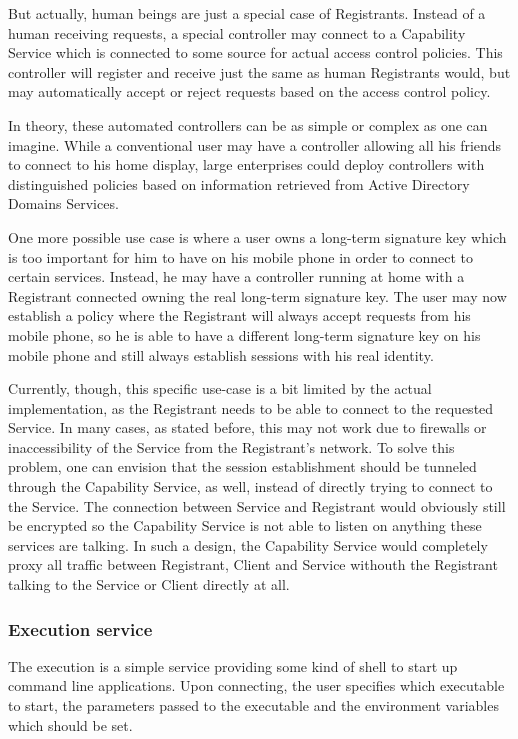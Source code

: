 But actually, human beings are just a special case of Registrants.
Instead of a human receiving requests, a special controller may connect to a Capability Service which is connected to some source for actual access control policies.
This controller will register and receive just the same as human Registrants would, but may automatically accept or reject requests based on the access control policy.

In theory, these automated controllers can be as simple or complex as one can imagine.
While a conventional user may have a controller allowing all his friends to connect to his home display, large enterprises could deploy controllers with distinguished policies based on information retrieved from Active Directory Domains Services.

One more possible use case is where a user owns a long-term signature key which is too important for him to have on his mobile phone in order to connect to certain services.
Instead, he may have a controller running at home with a Registrant connected owning the real long-term signature key.
The user may now establish a policy where the Registrant will always accept requests from his mobile phone, so he is able to have a different long-term signature key on his mobile phone and still always establish sessions with his real identity.

Currently, though, this specific use-case is a bit limited by the actual implementation, as the Registrant needs to be able to connect to the requested Service.
In many cases, as stated before, this may not work due to firewalls or inaccessibility of the Service from the Registrant's network.
To solve this problem, one can envision that the session establishment should be tunneled through the Capability Service, as well, instead of directly trying to connect to the Service.
The connection between Service and Registrant would obviously still be encrypted so the Capability Service is not able to listen on anything these services are talking.
In such a design, the Capability Service would completely proxy all traffic between Registrant, Client and Service withouth the Registrant talking to the Service or Client directly at all.

\subsubsection{Execution service}
\label{sec:exec-service}

The execution is a simple service providing some kind of shell to start up command line applications.
Upon connecting, the user specifies which executable to start, the parameters passed to the executable and the environment variables which should be set.

